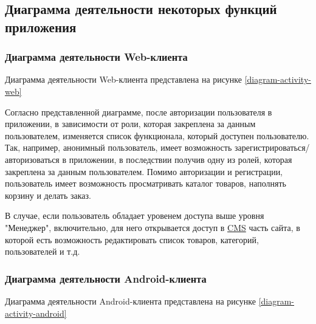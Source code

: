 \subsection{Диаграмма деятельности некоторых функций приложения}\label{subsec:2-activity-diagram}\indent

\subsubsection{Диаграмма деятельности Web-клиента}\indent

Диаграмма деятельности Web-клиента представлена на рисунке \ref{diagram-activity-web}
\clearpage
\begin{sidewaysfigure}

\end{sidewaysfigure}
\clearpage

Согласно представленной диаграмме, после авторизации пользователя в приложении, в зависимости от роли, которая закреплена за данным пользователем, изменяется список функционала, 
который доступен пользователю.
Так, например, анонимный пользователь, имеет возможность зарегистрироваться/авторизоваться в приложении, в последствии получив одну из ролей, которая закреплена за данным пользователем.
Помимо авторизации и регистрации, пользователь имеет возможность просматривать каталог товаров, наполнять корзину и делать заказ.

В случае, если пользователь обладает уровенем доступа выше уровня "Менеджер", включительно, для него открывается доступ в \hyperlink{gloss:cms}{CMS} часть сайта, 
в которой есть возможность редактировать список товаров, категорий, пользователей и т.д.


\subsubsection{Диаграмма деятельности Android-клиента}\indent

Диаграмма деятельности Android-клиента представлена на рисунке \ref{diagram-activity-android}

\begin{sidewaysfigure}

\end{sidewaysfigure}
